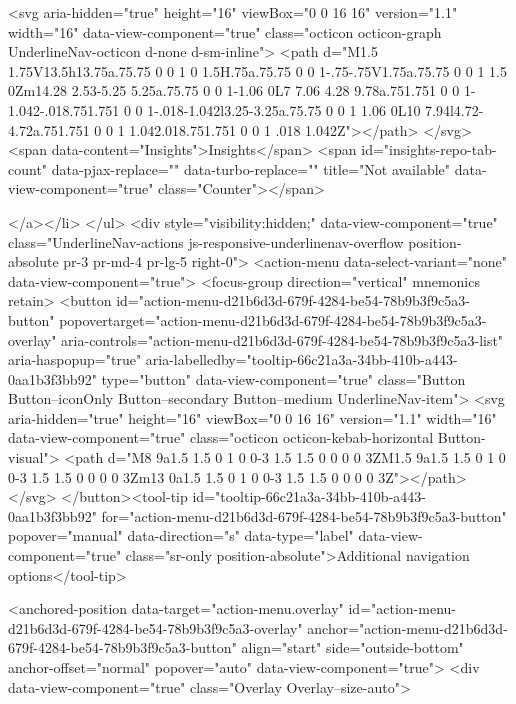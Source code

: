               <svg aria-hidden="true" height="16" viewBox="0 0 16 16" version="1.1" width="16" data-view-component="true" class="octicon octicon-graph UnderlineNav-octicon d-none d-sm-inline">
    <path d="M1.5 1.75V13.5h13.75a.75.75 0 0 1 0 1.5H.75a.75.75 0 0 1-.75-.75V1.75a.75.75 0 0 1 1.5 0Zm14.28 2.53-5.25 5.25a.75.75 0 0 1-1.06 0L7 7.06 4.28 9.78a.751.751 0 0 1-1.042-.018.751.751 0 0 1-.018-1.042l3.25-3.25a.75.75 0 0 1 1.06 0L10 7.94l4.72-4.72a.751.751 0 0 1 1.042.018.751.751 0 0 1 .018 1.042Z"></path>
</svg>
        <span data-content="Insights">Insights</span>
          <span id="insights-repo-tab-count" data-pjax-replace="" data-turbo-replace="" title="Not available" data-view-component="true" class="Counter"></span>


    
</a></li>
</ul>
    <div style="visibility:hidden;" data-view-component="true" class="UnderlineNav-actions js-responsive-underlinenav-overflow position-absolute pr-3 pr-md-4 pr-lg-5 right-0">      <action-menu data-select-variant="none" data-view-component="true">
  <focus-group direction="vertical" mnemonics retain>
    <button id="action-menu-d21b6d3d-679f-4284-be54-78b9b3f9c5a3-button" popovertarget="action-menu-d21b6d3d-679f-4284-be54-78b9b3f9c5a3-overlay" aria-controls="action-menu-d21b6d3d-679f-4284-be54-78b9b3f9c5a3-list" aria-haspopup="true" aria-labelledby="tooltip-66c21a3a-34bb-410b-a443-0aa1b3f3bb92" type="button" data-view-component="true" class="Button Button--iconOnly Button--secondary Button--medium UnderlineNav-item">  <svg aria-hidden="true" height="16" viewBox="0 0 16 16" version="1.1" width="16" data-view-component="true" class="octicon octicon-kebab-horizontal Button-visual">
    <path d="M8 9a1.5 1.5 0 1 0 0-3 1.5 1.5 0 0 0 0 3ZM1.5 9a1.5 1.5 0 1 0 0-3 1.5 1.5 0 0 0 0 3Zm13 0a1.5 1.5 0 1 0 0-3 1.5 1.5 0 0 0 0 3Z"></path>
</svg>
</button><tool-tip id="tooltip-66c21a3a-34bb-410b-a443-0aa1b3f3bb92" for="action-menu-d21b6d3d-679f-4284-be54-78b9b3f9c5a3-button" popover="manual" data-direction="s" data-type="label" data-view-component="true" class="sr-only position-absolute">Additional navigation options</tool-tip>


<anchored-position data-target="action-menu.overlay" id="action-menu-d21b6d3d-679f-4284-be54-78b9b3f9c5a3-overlay" anchor="action-menu-d21b6d3d-679f-4284-be54-78b9b3f9c5a3-button" align="start" side="outside-bottom" anchor-offset="normal" popover="auto" data-view-component="true">
  <div data-view-component="true" class="Overlay Overlay--size-auto">
    
